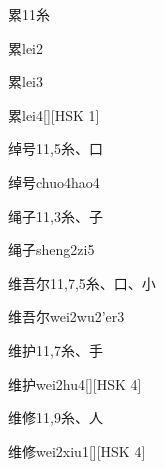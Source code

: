 \begin{entry}{累}{11}{⽷}
  \begin{phonetics}{累}{lei2}
  \end{phonetics}
  \begin{phonetics}{累}{lei3}
  \end{phonetics}
  \begin{phonetics}{累}{lei4}[][HSK 1]
  \end{phonetics}
\end{entry}

\begin{entry}{绰号}{11,5}{⽷、⼝}
  \begin{phonetics}{绰号}{chuo4hao4}
  \end{phonetics}
\end{entry}

\begin{entry}{绳子}{11,3}{⽷、⼦}
  \begin{phonetics}{绳子}{sheng2zi5}
  \end{phonetics}
\end{entry}

\begin{entry}{维吾尔}{11,7,5}{⽷、⼝、⼩}
  \begin{phonetics}{维吾尔}{wei2wu2'er3}
  \end{phonetics}
\end{entry}

\begin{entry}{维护}{11,7}{⽷、⼿}
  \begin{phonetics}{维护}{wei2hu4}[][HSK 4]
  \end{phonetics}
\end{entry}

\begin{entry}{维修}{11,9}{⽷、⼈}
  \begin{phonetics}{维修}{wei2xiu1}[][HSK 4]
  \end{phonetics}
\end{entry}

